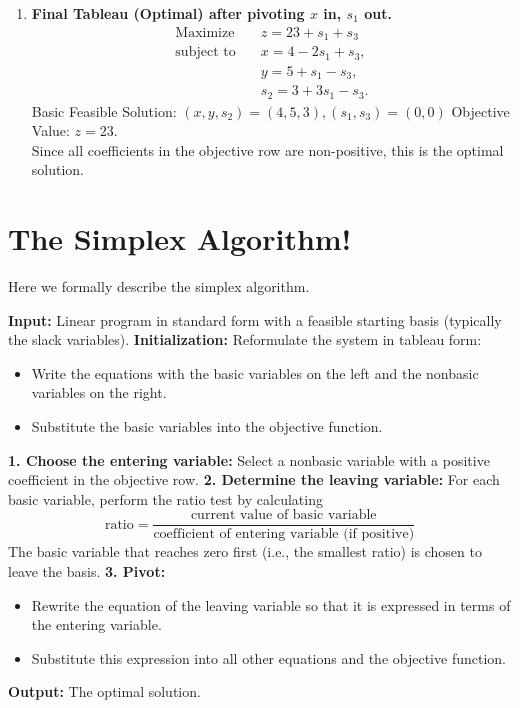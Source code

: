 \begin{enumerate}
    \item \textbf{Final Tableau (Optimal) after pivoting $x$ in, $s_1$ out.}  
    \[
    \begin{aligned}
    \text{Maximize} \quad & z = 23 + s_1 + s_3 \\
    \text{subject to} \quad 
    & x = 4 - 2s_1 + s_3, \\
    & y = 5 + s_1 - s_3, \\
    & s_2 = 3 + 3s_1 - s_3.
    \end{aligned}
    \]
    Basic Feasible Solution: \( (x,y,s_2) = (4,5,3), (s_1,s_3) = (0,0) \)  
    Objective Value: \( z = 23 \).\\ 
    Since all coefficients in the objective row are non-positive, this is the optimal solution.
\end{enumerate}


\section{ The Simplex Algorithm!}
Here we formally describe the simplex algorithm.
\begin{algorithm}[H]
\caption{Simplex Algorithm}
\begin{algorithmic}[1]
\State \textbf{Input:} Linear program in standard form with a feasible starting basis (typically the slack variables).
\State \textbf{Initialization:} Reformulate the system in tableau form:
  \begin{itemize}
    \item Write the equations with the basic variables on the left and the nonbasic variables on the right.
    \item Substitute the basic variables into the objective function.
  \end{itemize}
\Repeat
  \State \textbf{1. Choose the entering variable:} Select a nonbasic variable with a positive coefficient in the objective row.
  \State \textbf{2. Determine the leaving variable:} For each basic variable, perform the ratio test by calculating
  \[
  \text{ratio} = \frac{\text{current value of basic variable}}{\text{coefficient of entering variable (if positive)}}
  \]
  The basic variable that reaches zero first (i.e., the smallest ratio) is chosen to leave the basis.
  \State \textbf{3. Pivot:} 
  \begin{itemize}
    \item Rewrite the equation of the leaving variable so that it is expressed in terms of the entering variable.
    \item Substitute this expression into all other equations and the objective function.
  \end{itemize}
\State \textbf{Output:} The optimal solution.
\end{algorithmic}
\end{algorithm}


